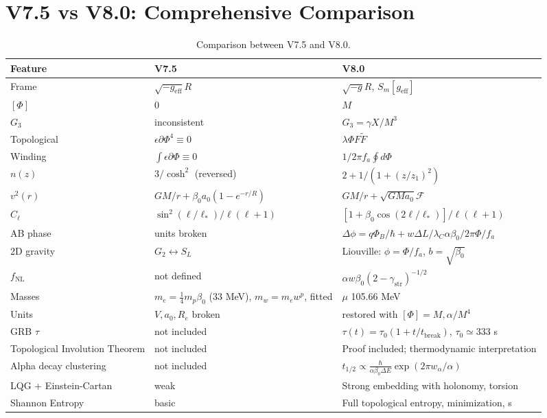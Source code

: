 \documentclass[11pt,a4paper]{article}
\begin{document}
\section{V7.5 vs V8.0: Comprehensive Comparison}
\begin{table}[H]
\centering
\caption{Comparison between V7.5 and V8.0.}
\begin{tabular}{lp{6cm}p{6cm}}
\toprule
Feature & V7.5 & V8.0 \\
\midrule
Frame & \(\sqrt{-g_{\text{eff}}}R\) & \(\sqrt{-g}R\), \(S_m[g_{\text{eff}}]\) \\
\([\Phi]\) & 0 & \(M\) \\
\(G_3\) & inconsistent & \(G_3 = \gamma X/M^3\) \\
Topological & \(\epsilon \partial \Phi^4 \equiv 0\) & \(\lambda \Phi F\tilde{F}\) \\
Winding & \(\int \epsilon \partial \Phi \equiv 0\) & \(1/2\pi f_a \oint d\Phi\) \\
\(n(z)\) & \(3/\cosh^2\) (reversed) & \(2 + 1/(1+(z/z_1)^2)\) \\
\(v^2(r)\) & \(GM/r + \beta_0 a_0 (1-e^{-r/R})\) & \(GM/r + \sqrt{GMa_0}\mathcal{F}\) \\
\(C_\ell\) & \(\sin^2(\ell/\ell_*)/\ell(\ell+1)\) & \([1+\beta_0\cos(2\ell/\ell_*)]/\ell(\ell+1)\) \\
AB phase & units broken & \(\Delta\phi = q\Phi_B/\hbar + w\Delta L/\lambda_C \alpha\beta_0/2\pi \Phi/f_a\) \\
2D gravity & \(G_2 \leftrightarrow S_L\) & Liouville: \(\phi=\Phi/f_a\), \(b=\sqrt{\beta_0}\) \\
\(f_{\mathrm{NL}}\) & not defined & \(\alpha w\beta_0 (2-\gamma_{\text{str}})^{-1/2}\) \\
Masses & \(m_e = \frac{1}{4}m_p\beta_0\) (33 MeV), \(m_w = m_e w^p\), fitted & \(\mu\) 105.66 MeV \\
Units & \(V,a_0,R_e\) broken & restored with \([\Phi]=M, \alpha/M^4\) \\
GRB \(\tau\) & not included & \(\tau(t)=\tau_0(1+t/t_{\text{break}})\), \(\tau_0\simeq333\) s \\
Topological Involution Theorem & not included & Proof included; thermodynamic interpretation \\
Alpha decay clustering & not included & \(t_{1/2}\propto \frac{\hbar}{\alpha\beta_0\Delta E}\exp(2\pi w_\alpha/\alpha)\) \\
LQG + Einstein-Cartan & weak & Strong embedding with holonomy, torsion \\
Shannon Entropy & basic & Full topological entropy, minimization, s \\

\end{tabular}
\end{table}
\end{document}
